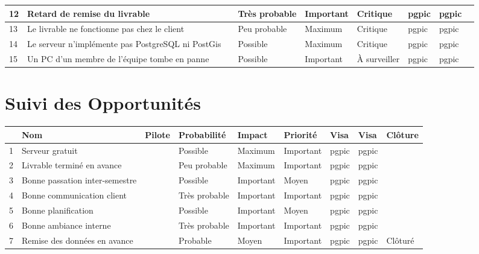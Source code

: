 \documentclass[asi]{picInsa}
\begin{document}
\begin{longtable}{|p{0.3cm}|p{2.5cm}|p{2cm}|p{2cm}|p{1.8cm}|p{1.5cm}|p{1cm}|p{1cm}|p{1.5cm}|}
			 12 & Retard de remise du livrable & \Kafui & Très probable & Important & Critique & pgpic & pgpic & \\\hline
			 
			 13 & Le livrable ne fonctionne pas chez le client & \Melissa & Peu probable & Maximum & Critique & pgpic & pgpic & \\\hline
			 
			 14 & Le serveur n’implémente pas PostgreSQL ni PostGis & \Sergi & Possible & Maximum & Critique & pgpic & pgpic & \\\hline
			 
			 15 & Un PC d'un membre de l'équipe tombe en panne & \Sergi & Possible & Important & À surveiller & pgpic & pgpic & \\\hline
			 
			 
			 
\end{longtable}

\chapter*{Suivi des Opportunités}

\begin{longtable}{|p{0.3cm}|p{2.5cm}|p{2cm}|p{2cm}|p{1.8cm}|p{1.8cm}|p{1cm}|p{1cm}|p{1.5cm}|}
			\hline
			\rowcolor{gray!40}
			\No & Nom & Pilote & Probabilité & Impact & Priorité & Visa \RQCourt{} & Visa \CPCourt{} & Clôture \\\hline
			 1 & Serveur gratuit & \Matthieu & Possible & Maximum & Important & pgpic & pgpic & \\\hline
			 2 & Livrable terminé en avance & \Kafui & Peu probable & Maximum & Important & pgpic & pgpic & \\\hline
			 3 & Bonne passation inter-semestre & \Pierre & Possible & Important & Moyen & pgpic & pgpic & \\\hline
			 4 & Bonne communication client & \Florian & Très probable & Important & Important & pgpic & pgpic & \\\hline
			 5 & Bonne planification & \Pierre & Possible & Important & Moyen & pgpic & pgpic & \\\hline
			 6 & Bonne ambiance interne & \Michel & Très probable & Important & Important & pgpic & pgpic & \\\hline
			 7 & Remise des données en avance & \Sergi & Probable & Moyen & Important & pgpic & pgpic & Clôturé \\\hline
\end{longtable}
\end{document}
